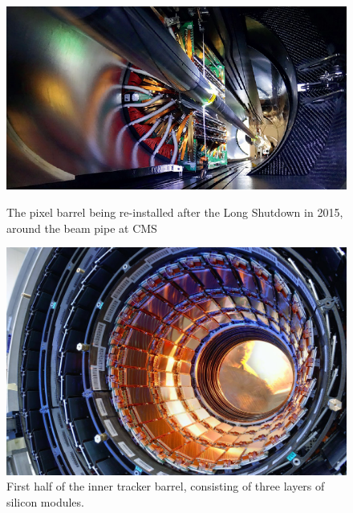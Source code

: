   
       \begin{figure}[ht]
  	\centering
  	\begin{minipage}[b]{0.4\textwidth}
  		\includegraphics[width=\textwidth]{2_ExperimentalSetup/Figures/cmspixel}
  		\caption{The pixel barrel being re-installed after the Long Shutdown in 2015, around the beam pipe at CMS\cite{Christine:2024986}}
  		\label{fig:pix}
  	\end{minipage}
  	\hfill
  	\begin{minipage}[b]{0.4\textwidth}
  		\includegraphics[width=\textwidth]{2_ExperimentalSetup/Figures/cmsbarrel}
  		\caption{First half of the inner tracker barrel, consisting of three layers of silicon modules.\cite{beautiful:1998635}}
  			\label{fig:Trackpics}
  	\end{minipage}
  
  \end{figure}
  
